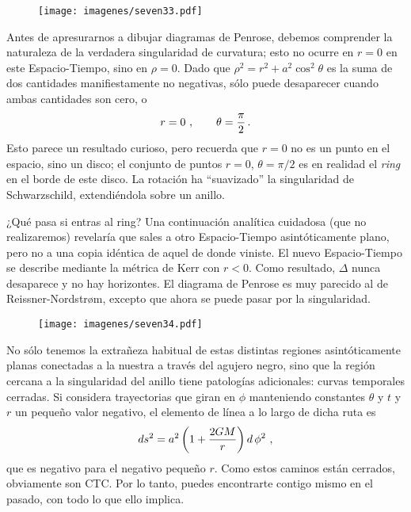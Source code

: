 \documentclass[11pt,b5paper,openany,twoside]{book}
\begin{document}
\begin{figure}[t]
\centering
\texttt{[image: imagenes/seven33.pdf]}
\end{figure}

Antes de apresurarnos a dibujar diagramas de Penrose, debemos comprender la naturaleza de la verdadera singularidad de curvatura; esto no ocurre en $r=0$ en este Espacio-Tiempo, sino en $\rho=0$.
Dado que $\rho^2 = r^2+a^2\cos^2\theta$ es la suma de dos cantidades manifiestamente no negativas, sólo puede desaparecer cuando ambas cantidades son cero, o
\begin{equation}
r=0\ ,\qquad \theta = {\pi\over 2}\,.\label{7.129}
\end{equation}
Esto parece un resultado curioso, pero recuerda que $r=0$ no es un punto en el espacio, sino un disco; el conjunto de puntos $r=0$, $\theta=\pi/2$ es en realidad el {\it ring} en el borde de este disco.
La rotación ha ``suavizado'' la singularidad de Schwarzschild, extendiéndola sobre un anillo.

¿Qué pasa si entras al ring? Una continuación analítica cuidadosa (que no realizaremos) revelaría que sales a otro Espacio-Tiempo asintóticamente plano, pero no a una copia idéntica de aquel de donde viniste.
El nuevo Espacio-Tiempo se describe mediante la métrica de Kerr con $r<0$.
Como resultado, $\Delta$ nunca desaparece y no hay horizontes.
El diagrama de Penrose es muy parecido al de Reissner-Nordstr{\o}m, excepto que ahora se puede pasar por la singularidad.

\begin{figure}[h]
\centering
\texttt{[image: imagenes/seven34.pdf]}
\end{figure}

No sólo tenemos la extrañeza habitual de estas distintas regiones asintóticamente planas conectadas a la nuestra a través del agujero negro, sino que la región cercana a la singularidad del anillo tiene patologías adicionales: curvas temporales cerradas.
Si considera trayectorias que giran en $\phi$ manteniendo constantes $\theta$ y $t$ y $r$ un pequeño valor negativo, el elemento de línea a lo largo de dicha ruta es
\begin{equation}
ds^2 = a^2\left(1+{{2GM}\over r}\right) d\,\phi^2\ ,\label{7.130}
\end{equation}
que es negativo para el negativo pequeño $r$.
Como estos caminos están cerrados, obviamente son CTC.
Por lo tanto, puedes encontrarte contigo mismo en el pasado, con todo lo que ello implica.
\end{document}
